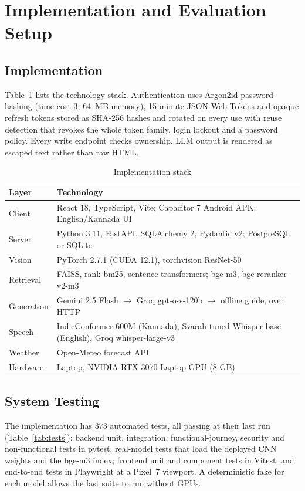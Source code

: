 \section{Implementation and Evaluation Setup}
\subsection{Implementation}
Table~\ref{tab:stack} lists the technology stack. Authentication uses Argon2id password hashing
(time cost 3, 64~MB memory), 15-minute JSON Web Tokens and opaque refresh tokens stored as SHA-256 hashes and rotated on
every use with reuse detection that revokes the whole token family, login lockout and a password policy. Every write
endpoint checks ownership. LLM output is rendered as escaped text rather than raw HTML.

\begin{table}[t]
\caption{Implementation stack}
\label{tab:stack}
\centering
\scriptsize
\setlength{\tabcolsep}{3pt}
\begin{tabular}{@{}p{1.9cm}p{6.0cm}@{}}
\toprule
Layer & Technology \\
\midrule
Client & React 18, TypeScript, Vite; Capacitor 7 Android APK; English/Kannada UI \\
Server & Python 3.11, FastAPI, SQLAlchemy 2, Pydantic v2; PostgreSQL or SQLite \\
Vision & PyTorch 2.7.1 (CUDA 12.1), torchvision ResNet-50 \\
Retrieval & FAISS, rank-bm25, sentence-transformers; bge-m3, bge-reranker-v2-m3 \\
Generation & Gemini 2.5 Flash $\rightarrow$ Groq gpt-oss-120b $\rightarrow$ offline guide, over HTTP \\
Speech & IndicConformer-600M (Kannada), Svarah-tuned Whisper-base (English), Groq whisper-large-v3 \\
Weather & Open-Meteo forecast API \\
Hardware & Laptop, NVIDIA RTX 3070 Laptop GPU (8 GB) \\
\bottomrule
\end{tabular}
\end{table}

\subsection{System Testing}
The implementation has 373 automated tests, all passing at their last run (Table~\ref{tab:tests}):
backend unit, integration, functional-journey, security and non-functional tests in pytest; real-model tests that load
the deployed CNN weights and the bge-m3 index; frontend unit and component tests in Vitest; and end-to-end tests in
Playwright at a Pixel~7 viewport. A deterministic fake for each model allows the fast suite to run without GPUs.


